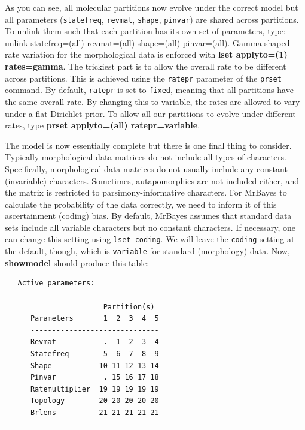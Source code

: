 \documentclass[12pt]{book}
\begin{document}
As you can see, all molecular partitions now evolve under the correct model but all parameters 
(\texttt{statefreq}, \texttt{revmat}, \texttt{shape}, \texttt{pinvar}) are shared across partitions. To 
unlink them such that each partition has its own set of parameters, type:  unlink statefreq=(all) 
revmat=(all) shape=(all) pinvar=(all). Gamma-shaped rate variation for the morphological data is enforced 
with \textbf{lset applyto=(1) rates=gamma}. The trickiest part is to allow the overall rate to be different 
across partitions. This is achieved using the \texttt{ratepr} parameter of the \texttt{prset} command. By 
default, \texttt{ratepr} is set to \texttt{fixed}, meaning that all partitions have the same overall rate. 
By changing this to variable, the rates are allowed to vary under a flat Dirichlet prior. To allow all our 
partitions to evolve under different rates, type \textbf{prset applyto=(all) ratepr=variable}.

The model is now essentially complete but there is one final thing to consider. Typically morphological data 
matrices do not include all types of characters. Specifically, morphological data matrices do not usually 
include any constant (invariable) characters. Sometimes, autapomorphies are not included either, and the 
matrix is restricted to parsimony-informative characters. For MrBayes to calculate the probability of the 
data correctly, we need to inform it of this ascertainment (coding) bias. By default, MrBayes assumes that 
standard data sets include all variable characters but no constant characters. If necessary, one can change 
this setting using \texttt{lset coding}. We will leave the \texttt{coding} setting at the default, though, 
which is \texttt{variable} for standard (morphology) data. Now, \textbf{showmodel} should produce this table:

\begin{singlespacing}
\small
\begin{verbatim}
   Active parameters:
 
                       Partition(s)
      Parameters       1  2  3  4  5
      ------------------------------
      Revmat           .  1  2  3  4
      Statefreq        5  6  7  8  9
      Shape           10 11 12 13 14
      Pinvar           . 15 16 17 18
      Ratemultiplier  19 19 19 19 19
      Topology        20 20 20 20 20
      Brlens          21 21 21 21 21
      ------------------------------
\end{verbatim}
\normalsize
\end{singlespacing}
\end{document}
